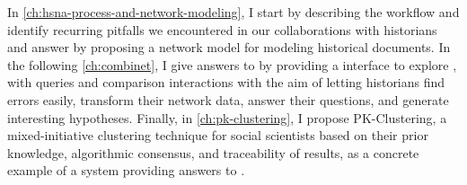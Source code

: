 


In \autoref{ch:hsna-process-and-network-modeling}, I start by describing the \hsna workflow and identify recurring pitfalls we encountered in our collaborations with historians and answer \qone by proposing a network model for modeling historical documents.
In the following \autoref{ch:combinet}, I give answers to \qtwo by providing a \va interface to explore \modelplural, with queries and comparison interactions with the aim of letting historians find errors easily, transform their network data, answer their questions, and generate interesting hypotheses.
Finally, in \autoref{ch:pk-clustering}, I propose PK-Clustering, a mixed-initiative clustering technique for social scientists based on their prior knowledge, algorithmic consensus, and traceability of results, as a concrete example of a system providing answers to \qthree.


